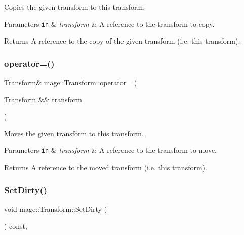 Copies the given transform to this transform.


\begin{DoxyParams}[1]{Parameters}
\mbox{\tt in}  & {\em transform} & A reference to the transform to copy. \\
\hline
\end{DoxyParams}
\begin{DoxyReturn}{Returns}
A reference to the copy of the given transform (i.\+e. this transform). 
\end{DoxyReturn}
\hypertarget{structmage_1_1_transform_a73f47760665264da8af254fa937b3560}{}\label{structmage_1_1_transform_a73f47760665264da8af254fa937b3560} 
\subsubsection{\texorpdfstring{operator=()}{operator=()}\hspace{0.1cm}{\footnotesize\ttfamily [2/2]}}
{\footnotesize\ttfamily \hyperlink{structmage_1_1_transform}{Transform}\& mage\+::\+Transform\+::operator= (\begin{DoxyParamCaption}\item[{\hyperlink{structmage_1_1_transform}{Transform} \&\&}]{transform }\end{DoxyParamCaption})\hspace{0.3cm}{\ttfamily [default]}}

Moves the given transform to this transform.


\begin{DoxyParams}[1]{Parameters}
\mbox{\tt in}  & {\em transform} & A reference to the transform to move. \\
\hline
\end{DoxyParams}
\begin{DoxyReturn}{Returns}
A reference to the moved transform (i.\+e. this transform). 
\end{DoxyReturn}
\hypertarget{structmage_1_1_transform_a8d760d79f5ad68377706234b8575e429}{}\label{structmage_1_1_transform_a8d760d79f5ad68377706234b8575e429} 
\subsubsection{\texorpdfstring{Set\+Dirty()}{SetDirty()}}
{\footnotesize\ttfamily void mage\+::\+Transform\+::\+Set\+Dirty (\begin{DoxyParamCaption}{ }\end{DoxyParamCaption}) const\hspace{0.3cm}{\ttfamily [private]}, {\ttfamily [noexcept]}}

